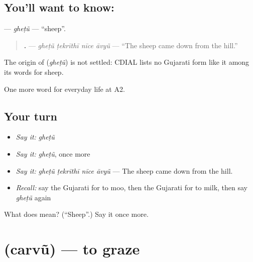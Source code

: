 \subsection*{You'll want to know: }
\textbf{} — \emph{gheṭũ} — \textquotedblleft{}sheep\textquotedblright{}.

\begin{quote}
\textbf{   .} — \emph{gheṭũ ṭekrīthī nīce āvyũ} — \textquotedblleft{}The sheep came down from the hill.\textquotedblright{}
\end{quote}

\begin{cousinweb}
The origin of \textbf{} (\emph{gheṭũ}) is not settled: CDIAL lists no Gujarati form like it among its words for sheep.
\end{cousinweb}

\begin{grammarlens}[title={What you've built}]
One more word for everyday life at A2.
\end{grammarlens}

\subsection*{Your turn}
\begin{itemize}
\raggedright
  \item \emph{Say it:} \emph{gheṭũ}
  \item \emph{Say it:} \emph{gheṭũ}, once more
  \item \emph{Say it:} \emph{gheṭũ ṭekrīthī nīce āvyũ} — The sheep came down from the hill.
  \item \emph{Recall:} say the Gujarati for to moo, then the Gujarati for to milk, then say \emph{gheṭũ} again
\end{itemize}

\begin{tcolorbox}[breakable,colback=teal!4,colframe=teal!35!black,title={Before you move on}]
What does  mean? (\textquotedblleft{}Sheep\textquotedblright{}.) Say it once more.
\end{tcolorbox}
\section[\texorpdfstring{\gu{ચરવું} (carvũ)}{ચરવું (carvũ)}]{ (carvũ) — to graze}

\label{lesson:GU-C234-carvu}



